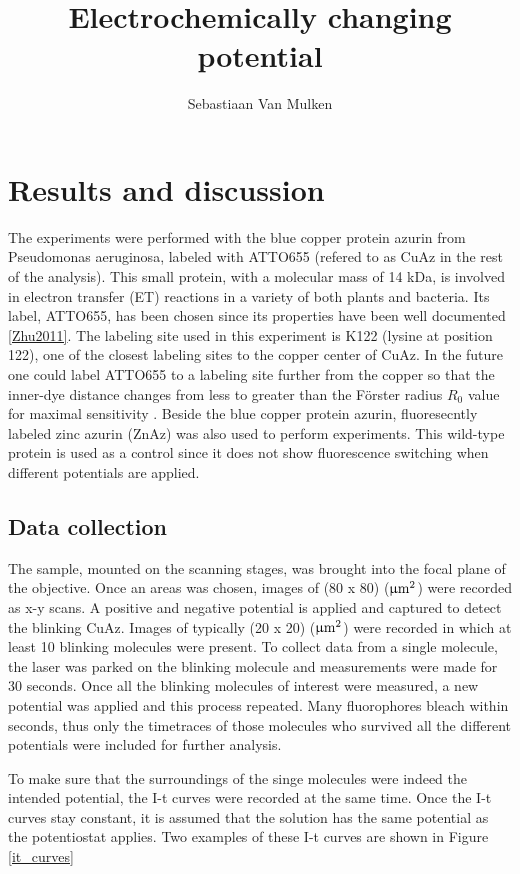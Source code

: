\documentclass[twoside,single]{lion-msc}
\title{Electrochemically changing potential}
\author{Sebastiaan Van Mulken}
\begin{document}
\maketitle

\chapter{Results and discussion}

The experiments were performed with the blue copper protein azurin from Pseudomonas aeruginosa, labeled with ATTO655 (refered to as CuAz in the rest of the analysis). This small protein, with a molecular mass of 14 kDa, is involved in electron transfer (ET) reactions in a variety of both plants and bacteria. Its label, ATTO655, has been chosen since its properties have been well documented \ref{Zhu2011}. The labeling site used in this experiment is K122 (lysine at position 122), one of the closest labeling sites to the copper center of CuAz. In the future one could label ATTO655 to a labeling site further from the copper so that the inner-dye distance changes from less to greater than the F\"{o}rster radius $R_{0}$ value for maximal sensitivity \cite{Roy2008}. 
Beside the blue copper protein azurin, fluoresecntly labeled zinc azurin (ZnAz) was also used to perform experiments. This wild-type protein is used as a control since it does not show fluorescence switching when different potentials are applied.

\section*{Data collection} \label{data_coll}
The sample, mounted on the scanning stages, was brought into the focal plane of the objective. Once an areas was chosen, images of (80 x 80) ($\upmu \textup{m}^{2}$) were recorded as x-y scans. A positive and negative potential is applied and captured to detect the blinking CuAz. Images of typically (20 x 20) ($\upmu \textup{m}^{2}$) were recorded in which at least 10 blinking molecules were present. To collect data from a single molecule, the laser was parked on the blinking molecule and measurements were made for 30 seconds. Once all the blinking molecules of interest were measured, a new potential was applied and this process repeated. Many fluorophores bleach within seconds, thus only the timetraces of those molecules who survived all the different potentials were included for further analysis. 

To make sure that the surroundings of the singe molecules were indeed the intended potential, the I-t curves were recorded at the same time. Once the I-t curves stay constant, it is assumed that the solution has the same potential as the potentiostat applies. Two examples of these I-t curves are shown in Figure \ref{it_curves}
\end{document}
